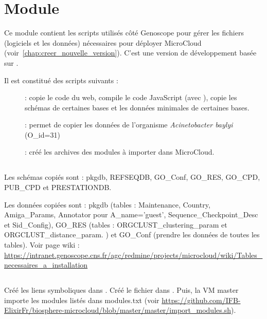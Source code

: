 \chapter{Module \micWEBdeployVer}

Ce module contient les scripts utilisés côté Genoscope pour gérer les fichiers (logiciels et les données) nécessaires pour déployer MicroCloud (voir~\autoref{chap:creer_nouvelle_version}).
C'est une version de développement basée sur .

Il est constitué des scripts suivants :
\begin{description}
	\item[] : copie le code du web, compile le code JavaScript (avec ), copie les schémas de certaines bases et les données minimales de certaines bases.
	\item[] : permet de copier les données de l'organisme \textit{Acinetobacter baylyi} (O\_id=31)
	\item[]: créé les archives des modules à importer dans MicroCloud.
\end{description}

\section{}

Les schémas copiés sont : pkgdb, REFSEQDB, GO\_Conf, GO\_RES, GO\_CPD, PUB\_CPD et PRESTATIONDB.
\newline

Les données copiées sont : pkgdb (tables : Maintenance, Country, Amiga\_Params,
Annotator pour A\_name='guest', Sequence\_Checkpoint\_Desc et Sid\_Config), GO\_RES (tables : ORGCLUST\_clustering\_param et ORGCLUST\_distance\_param.
) et GO\_Conf (prendre les données de toutes les tables). Voir page wiki : \url{https://intranet.genoscope.cns.fr/agc/redmine/projects/microcloud/wiki/Tables_necessaires_a_installation}


\section{}

Créé les liens symboliques dans .
Créé le fichier  dans .
\newline
Puis, la VM master importe les modules listés dans modules.txt (voir \url{https://github.com/IFB-ElixirFr/biosphere-microcloud/blob/master/master/import_modules.sh}).


